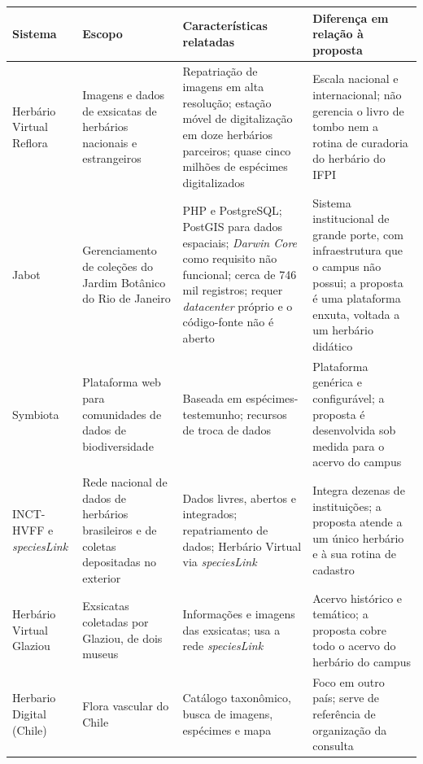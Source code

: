 \documentclass[
    12pt,        %
    openany,     %
    oneside,     %
    a4paper,     %
    english,     %
    french,      %
    spanish,     %
    brazil,      %
    article      %
]{abntex2}
\begin{document}
\begin{quadro}[H]
    \centering
    \caption{Comparação entre sistemas relacionados e a plataforma proposta}
    \label{qua:relacionados}
    \small
    \begin{tabularx}{\textwidth}{|p{2.6cm}|p{3.2cm}|X|X|}
        \hline
        \textbf{Sistema} & \textbf{Escopo} & \textbf{Características relatadas} & \textbf{Diferença em relação à proposta} \\
        \hline
        Herbário Virtual Reflora \cite{gasper2021digitalizacao,paton2026digitisation} & Imagens e dados de exsicatas de herbários nacionais e estrangeiros & Repatriação de imagens em alta resolução; estação móvel de digitalização em doze herbários parceiros; quase cinco milhões de espécimes digitalizados & Escala nacional e internacional; não gerencia o livro de tombo nem a rotina de curadoria do herbário do IFPI \\ \hline
        Jabot \cite{silva2017jabot} & Gerenciamento de coleções do Jardim Botânico do Rio de Janeiro & PHP e PostgreSQL; PostGIS para dados espaciais; \textit{Darwin Core} como requisito não funcional; cerca de 746 mil registros; requer \textit{datacenter} próprio e o código-fonte não é aberto & Sistema institucional de grande porte, com infraestrutura que o campus não possui; a proposta é uma plataforma enxuta, voltada a um herbário didático \\ \hline
        Symbiota \cite{gries2014symbiota} & Plataforma web para comunidades de dados de biodiversidade & Baseada em espécimes-testemunho; recursos de troca de dados & Plataforma genérica e configurável; a proposta é desenvolvida sob medida para o acervo do campus \\ \hline
        INCT-HVFF e \textit{speciesLink} \cite{incthvff2026} & Rede nacional de dados de herbários brasileiros e de coletas depositadas no exterior & Dados livres, abertos e integrados; repatriamento de dados; Herbário Virtual via \textit{speciesLink} & Integra dezenas de instituições; a proposta atende a um único herbário e à sua rotina de cadastro \\ \hline
        Herbário Virtual Glaziou \cite{glaziou2026} & Exsicatas coletadas por Glaziou, de dois museus & Informações e imagens das exsicatas; usa a rede \textit{speciesLink} & Acervo histórico e temático; a proposta cobre todo o acervo do herbário do campus \\ \hline
        Herbario Digital (Chile) \cite{herbariodigital2026} & Flora vascular do Chile & Catálogo taxonômico, busca de imagens, espécimes e mapa & Foco em outro país; serve de referência de organização da consulta \\ \hline
    \end{tabularx}
\end{quadro}
\end{document}
